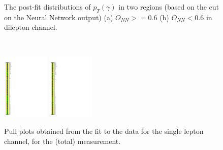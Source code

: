 \begin{figure}[ht]
  \centering
  \quad\quad
  \caption{The post-fit distributions of $p_T(\gamma)$ in two regions (based on the cut on the Neural Network output) (a) $O_{NN}>=0.6$ (b) $O_{NN}<0.6$ 
  in dilepton channel.}
  \label{fig:pt_postfit_dilep_tty_total_realdata}
\end{figure}
\


\begin{figure}[ht]
  \centering
  \includegraphics[width=0.20\textwidth]{figures/diff_xsec/ljet_tty_total_mu_blinded/compare_NP_pulls/compare_NP_dilep_fits_drphb_drlj_dr/NuisPar_comp.pdf}
  \quad \quad
  \includegraphics[width=0.20\textwidth]{figures/diff_xsec/ljet_tty_total_mu_blinded/compare_NP_pulls/compare_NP_dilep_fits_pt_ptj1_eta/NuisPar_comp.pdf}
  \caption{Pull plots obtained from the fit to the data for the single lepton channel, for the \tty (total) measurement.}
  \label{fig:pull_plot_pt_ljet_mu_blinded_tty_total}
\end{figure}
\FloatBarrier


